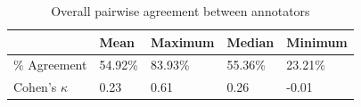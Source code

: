 \documentclass[a4paper]{article}
\begin{document}
		\begin{table}
			\centering
			\caption{Overall pairwise agreement between annotators}
			{\color{blue}
			\begin{tabularx}{\columnwidth}{lXXXX}
			\toprule
			 								& Mean & Maximum & Median & Minimum \\
			 \midrule
			 \% Agreement 		& 54.92\% & 83.93\% & 55.36\% & 23.21\% \\
			 Cohen's $\kappa$	& 0.23 & 0.61 & 0.26 & -0.01 \\
			 \bottomrule
			\end{tabularx}
			}
%			
			\label{tab:agreement:overall}
		\end{table}
		
\end{document}
